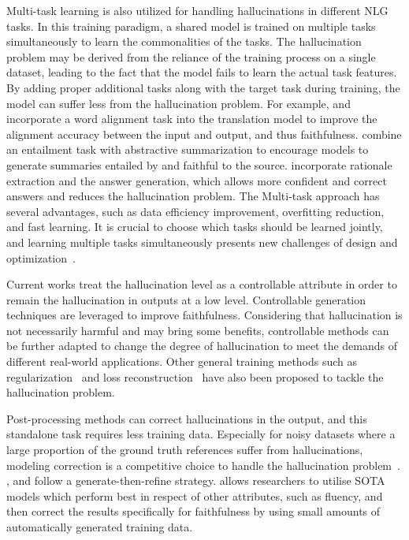 \vspace{-0.5em} 
Multi-task learning is also utilized for handling hallucinations in different NLG tasks. 
In this training paradigm, a shared model is trained on multiple tasks simultaneously to learn the commonalities of the tasks. The hallucination problem may be derived from the reliance of the training process on a single dataset, leading to the fact that the model fails to learn the actual task features. By adding proper additional tasks along with the target task during training, the model can suffer less from the hallucination problem.
For example,  and  incorporate a word alignment task into the translation model to improve the alignment accuracy between the input and output, and thus faithfulness.
 combine an entailment task with abstractive summarization to encourage models to generate summaries entailed by and faithful to the source.
 incorporate rationale extraction and the answer generation, which allows more confident and correct answers and reduces the hallucination problem.
The Multi-task approach has several advantages, such as data efficiency improvement, overfitting reduction, and fast learning. It is crucial to choose which tasks should be learned jointly, and learning multiple tasks simultaneously presents new challenges of design and optimization~.
\vspace{-0.5em}

Current works treat the hallucination level as a controllable attribute in order to remain the hallucination in outputs at a low level. 
Controllable generation techniques  are leveraged to improve faithfulness.
Considering that hallucination is not necessarily harmful and may bring some benefits, controllable methods can be further adapted to change the degree of hallucination to meet the demands of different real-world applications. 
Other general training methods such as regularization~ and loss reconstruction~ have also been proposed to tackle the hallucination problem.

Post-processing methods can correct hallucinations in the output, and this standalone task requires less training data. Especially for noisy datasets where a large proportion of the ground truth references suffer from hallucinations, modeling correction is a competitive choice to handle the hallucination problem~. 
, and  follow a generate-then-refine strategy. 
 allows researchers to utilise SOTA models which perform best in respect of other attributes, such as fluency, and then correct the results specifically for faithfulness by using small amounts of automatically generated training data.


